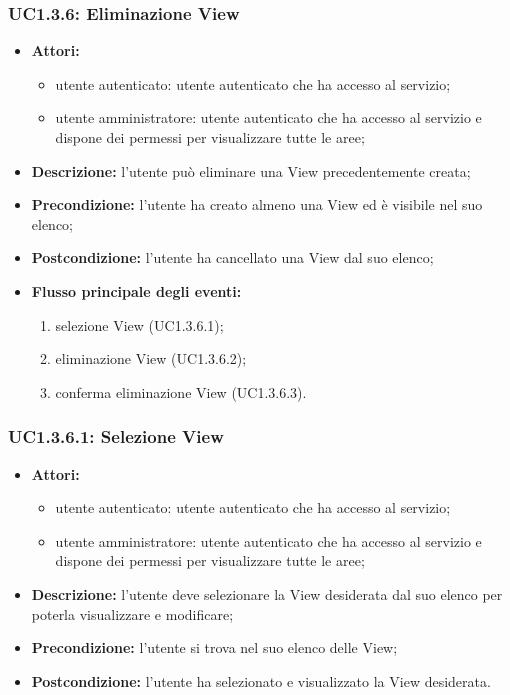 \subsubsection{UC1.3.6: Eliminazione View}

\begin{itemize}
    \item \textbf{Attori:}
    \begin{itemize}
    	\item utente autenticato: utente autenticato che ha accesso al servizio;
    	\item utente amministratore: utente autenticato che ha accesso al servizio e dispone dei permessi per visualizzare tutte le aree;
	\end{itemize}
    \item \textbf{Descrizione:} l'utente può eliminare una View precedentemente creata;
    \item \textbf{Precondizione:} l'utente ha creato almeno una View ed è visibile nel suo elenco;
    \item \textbf{Postcondizione:} l'utente ha cancellato una View dal suo elenco;
    \item \textbf{Flusso principale degli eventi:}
    \begin{enumerate}
        \item selezione View (UC1.3.6.1);
        \item eliminazione View (UC1.3.6.2);
        \item conferma eliminazione View (UC1.3.6.3).
    \end{enumerate}
\end{itemize}

\subsubsection{UC1.3.6.1: Selezione View}

\begin{itemize}
 	\item \textbf{Attori:}
    \begin{itemize}
    	\item utente autenticato: utente autenticato che ha accesso al servizio;
    	\item utente amministratore: utente autenticato che ha accesso al servizio e dispone dei permessi per visualizzare tutte le aree;
	\end{itemize}
    \item \textbf{Descrizione:} l'utente deve selezionare la View desiderata dal suo elenco per poterla visualizzare e modificare;
    \item \textbf{Precondizione:} l'utente si trova nel suo elenco delle View;
    \item \textbf{Postcondizione:} l'utente ha selezionato e visualizzato la View desiderata.
\end{itemize}


